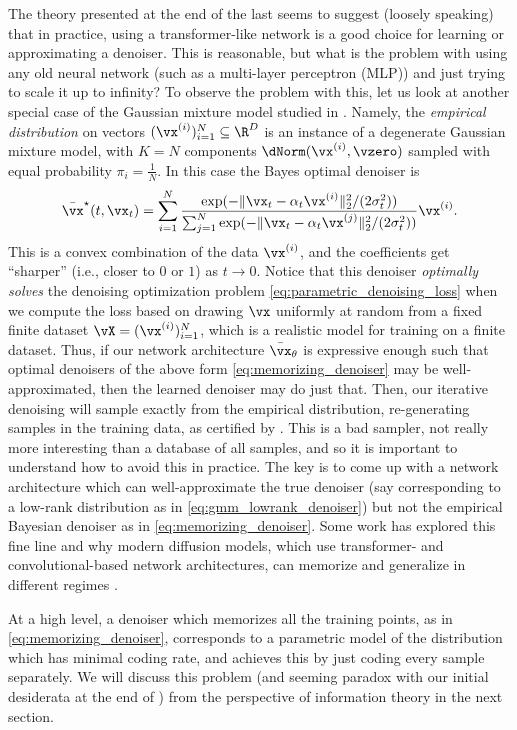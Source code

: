 \documentclass[../../book-main.tex]{subfiles}
\begin{document}
\begin{remark}
	The theory presented at the end of the last  seems to suggest (loosely speaking) that in practice, using a transformer-like network is a good choice for learning or approximating a denoiser. This is reasonable, but what is the problem with using any old neural network (such as a multi-layer perceptron (MLP)) and just trying to scale it up to infinity? To observe the problem with this, let us look at another special case of the Gaussian mixture model studied in . Namely, the \textit{empirical distribution} on vectors \((\vx^{(i)})_{i = 1}^{N} \subseteq \R^{D}\) is an instance of a degenerate Gaussian mixture model, with \(K = N\) components \(\dNorm(\vx^{(i)}, \vzero)\) sampled with equal probability \(\pi_{i} = \frac{1}{N}\). In this case the Bayes optimal denoiser is
	\begin{equation}\label{eq:memorizing_denoiser}
		\bar{\vx}^{\star}(t, \vx_{t}) = \sum_{i = 1}^{N}\frac{\exp({-\|\vx_{t} - \alpha_{t}\vx^{(i)}\|_{2}^{2}/(2\sigma_{t}^{2})})}{\sum_{j = 1}^{N}\exp({-\|\vx_{t} - \alpha_{t}\vx^{(j)}\|_{2}^{2}/(2\sigma_{t}^{2})})}\vx^{(i)}.
	\end{equation}
	This is a convex combination of the data \(\vx^{(i)}\), and the coefficients get ``sharper'' (i.e., closer to \(0\) or \(1\)) as \(t \to 0\). Notice that this denoiser \textit{optimally solves} the denoising optimization problem \eqref{eq:parametric_denoising_loss} when we compute the loss based on drawing \(\vx\) uniformly at random from a fixed finite dataset \(\vX = (\vx^{(i)})_{i = 1}^{N}\), which is a realistic model for training on a finite dataset. Thus, if our network architecture \(\bar{\vx}_{\theta}\) is expressive enough such that optimal denoisers of the above form \eqref{eq:memorizing_denoiser} may be well-approximated, then the learned denoiser may do just that. Then, our iterative denoising  will sample exactly from the empirical distribution, re-generating samples in the training data, as certified by . This is a bad sampler, not really more interesting than a database of all samples, and so it is important to understand how to avoid this in practice. The key is to come up with a network architecture which can well-approximate the true denoiser (say corresponding to a low-rank distribution as in \eqref{eq:gmm_lowrank_denoiser}) but not the empirical Bayesian denoiser as in \eqref{eq:memorizing_denoiser}. Some work has explored this fine line and why modern diffusion models, which use transformer- and convolutional-based network architectures, can memorize and generalize in different regimes \citep{kamb2024analytic,niedoba2024towards}.

	At a high level, a denoiser which memorizes all the training points, as in \eqref{eq:memorizing_denoiser}, corresponds to a parametric model of the distribution which has minimal coding rate, and achieves this by just coding every sample separately. We will discuss this problem (and seeming paradox with our initial desiderata at the end of ) from the perspective of information theory in the next section.
\end{remark}
\end{document}
